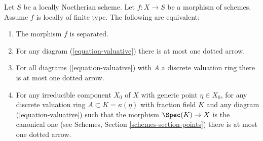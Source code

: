 \begin{lemma}
\label{lemma-Noetherian-dvr-valuative-separation}
Let $S$ be a locally Noetherian scheme.
Let $f : X \to S$ be a morphism of schemes.
Assume $f$ is locally of finite type.
The following are equivalent:
\begin{enumerate}
\item The morphism $f$ is separated.
\item For any diagram (\ref{equation-valuative}) there is at most
one dotted arrow.
\item For all diagrams (\ref{equation-valuative}) with $A$ a discrete
valuation ring there is at most one dotted arrow.
\item For any irreducible component $X_0$ of $X$ with
generic point $\eta \in X_0$, for any discrete valuation ring
$A \subset K = \kappa(\eta)$ with fraction field $K$ and any
diagram (\ref{equation-valuative}) such that
the morphism $\Spec(K) \to X$ is the canonical one
(see Schemes, Section \ref{schemes-section-points})
there is at most one dotted arrow.
\end{enumerate}
\end{lemma}

